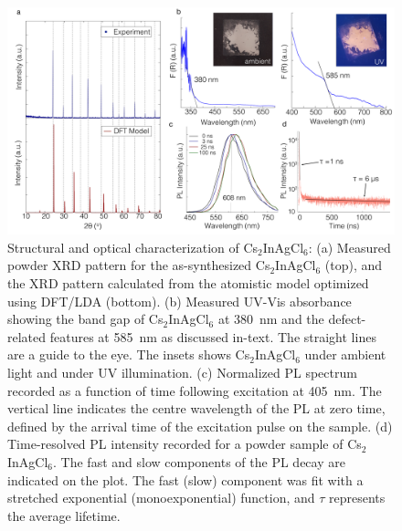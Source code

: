 \documentclass[journal=jpcl,manuscript=letter,layout=traditional]{achemso}
\begin{document}
\begin{figure}[ht!]
\begin{center}
\includegraphics[width=1.0\textwidth]{figure3.png}
\end{center}
\caption{\label{fig:3}
  Structural and optical characterization of Cs$_2$InAgCl$_6$:
  (a) Measured powder XRD pattern for the as-synthesized Cs$_2$InAgCl$_6$ (top),
  and the XRD pattern calculated from the atomistic model optimized using DFT/LDA (bottom).
  (b) Measured UV-Vis absorbance showing the band gap of Cs$_2$InAgCl$_6$ at 380~nm and
  the defect-related features at 585~nm as discussed in-text. The straight lines are a guide to the eye.
  The insets shows Cs$_2$InAgCl$_6$ under ambient light and under
  UV illumination. (c) Normalized PL spectrum recorded as a function of time following
  excitation at 405~nm. The vertical line
  indicates the centre wavelength of the PL at zero time, defined by the arrival time of the excitation
  pulse on the sample. (d)
  Time-resolved PL intensity recorded for a powder sample of Cs$_2$InAgCl$_6$. The fast and slow components of the
  PL decay are indicated on the plot. The fast (slow) component was fit with a stretched exponential (monoexponential)
  function, and $\tau$ represents the average lifetime.
  }
\end{figure}
\newpage
\end{document}
